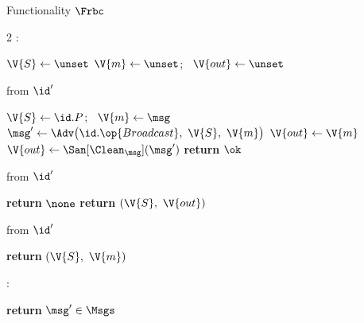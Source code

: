 \begin{interface}[nofloat]{Functionality $\Frbc$ \\
\params{$\PID$, \quad $\Ps$, \quad $\admits$, \quad
$\uses := \{(\Adv,\serves)\}$, \quad $\pars := \none$}}

{\scriptsize
\setlength{\columnsep}{1.4em}
\begin{multicols}{2}
:
\begin{algorithmic}[1]
\setcounter{contline}{0}\algcont
\State $\V{S} \gets \unset$
\State $\V{m} \gets \unset$; \ $\V{out} \gets \unset$
\algsave
\end{algorithmic}
\vspace{1.4ex}

 \quad from $\id'$
\begin{algorithmic}[1]
\algcont
{} \label{ln:rbconce}
\State $\V{S} \gets \id.P$; \ $\V{m} \gets \msg$
\State $\msg' \gets \Adv\bigl(\id.\op{Broadcast},\ \V{S},\ \V{m}\bigr)$ \label{ln:rbcask}
\State $\V{out} \gets \V{m}$ \label{ln:rbchonest}
 \label{ln:rbctest}
  \State $\V{out} \gets \San[\Clean_{\msg}](\msg')$ \label{ln:rbcsub}
\EndIf
\State \textbf{return} $\ok$
\algsave
\end{algorithmic}
\vspace{1.4ex}

\columnbreak

 \quad from $\id'$
\begin{algorithmic}[1]
\algcont
{}
  \State \textbf{return} $\none$
\EndIf
\State \textbf{return} $(\V{S},\ \V{out})$ \label{ln:rbcread}
\algsave
\end{algorithmic}
\vspace{1.4ex}

 \quad from $\id'$
\begin{algorithmic}[1]
\algcont
\State \textbf{return} $(\V{S},\ \V{m})$ \label{ln:rbcleak}
\algsave
\end{algorithmic}
\vspace{1.4ex}

:
\begin{algorithmic}[1]
\algcont
\State \textbf{return} $\msg' \in \Msgs$
\algsave
\end{algorithmic}
\end{multicols}}
\end{interface}
